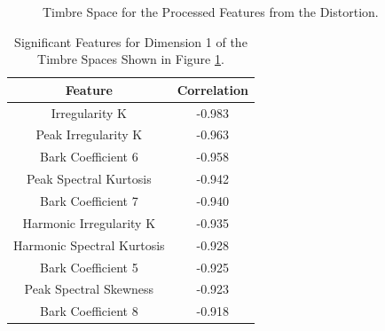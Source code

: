 		\begin{figure}[h!]
			\centering
			\qquad
			\caption{Timbre Space for the Processed Features from the Distortion.}
			\label{fig:DistortionProcessedMDSs}
		\end{figure}

		\begin{table}[h!]
			\centering
			\begin{tabular}{|c|c|}
				\hline
				\bf{Feature} & \bf{Correlation} \\
				\hline
				\hline
				Irregularity K & -0.983 \\
				\hline
				Peak Irregularity K & -0.963 \\
				\hline
				Bark Coefficient 6 & -0.958 \\
				\hline
				Peak Spectral Kurtosis & -0.942 \\
				\hline
				Bark Coefficient 7 & -0.940 \\
				\hline
				Harmonic Irregularity K & -0.935 \\
				\hline
				Harmonic Spectral Kurtosis & -0.928 \\
				\hline
				Bark Coefficient 5 & -0.925 \\
				\hline
				Peak Spectral Skewness & -0.923 \\
				\hline
				Bark Coefficient 8 & -0.918 \\
				\hline
			\end{tabular}
			\caption{Significant Features for Dimension 1 of the Timbre Spaces Shown in Figure 
				 \ref{fig:DistortionProcessedMDSs}.}
			\label{tab:DistortionProcessedFeaturesDim1}
		\end{table}

